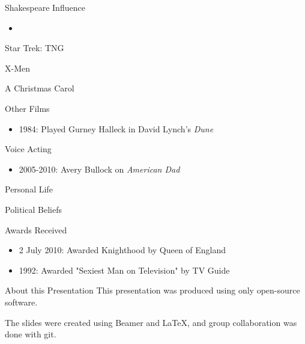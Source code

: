 \documentclass[xcolor=dvipsnames]{beamer}
\begin{document}
\begin{frame}{Shakespeare Influence}
  \begin{itemize}
    \item 
  \end{itemize}
\end{frame}

\begin{frame}{Star Trek: TNG}

\end{frame}

\begin{frame}{X-Men}

\end{frame}

\begin{frame}{A Christmas Carol}

\end{frame}

\begin{frame}{Other Films}
  \begin{itemize}
    \item 1984: Played Gurney Halleck in David Lynch's \emph{Dune}
  \end{itemize}
\end{frame}

\begin{frame}{Voice Acting}
  \begin{itemize} 
    \item 2005-2010: Avery Bullock on \emph{American Dad}
  \end{itemize}
\end{frame}

\begin{frame}{Personal Life}

\end{frame}

\begin{frame}{Political Beliefs}

\end{frame}

\begin{frame}{Awards Received}
  \begin{itemize}
    \item 2 July 2010: Awarded Knighthood by Queen of England
    \item 1992: Awarded "Sexiest Man on Television" by TV Guide
  \end{itemize}
\end{frame}
\begin{frame}{About this Presentation}
  This presentation was produced using only open-source software.

  The slides were created using Beamer and LaTeX, and group collaboration was done
  with git.
\end{frame}
\end{document}
